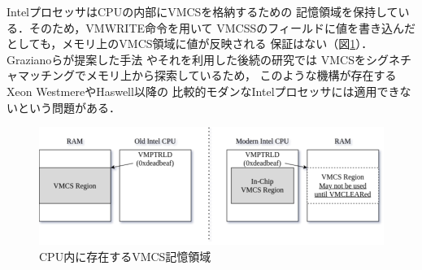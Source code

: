 IntelプロセッサはCPUの内部にVMCSを格納するための
記憶領域を保持している．そのため，VMWRITE命令を用いて
VMCSSのフィールドに値を書き込んだとしても，メモリ上のVMCS領域に値が反映される
保証はない\cite{intelsdm}\cite{rekall}（図\ref{fig:problem}）．Grazianoらが提案した手法
\cite{hypervisor_memory_forensics}やそれを利用した後続の研究\cite{kvm_vm_forensics}では
VMCSをシグネチャマッチングでメモリ上から探索しているため，
このような機構が存在するXeon WestmereやHaswell以降の
比較的モダンなIntelプロセッサには適用できないという問題がある．

\begin{figure}[h]
  \includegraphics[scale=0.305]{problem.png}
  \caption{CPU内に存在するVMCS記憶領域}
  \label{fig:problem}
\end{figure}
